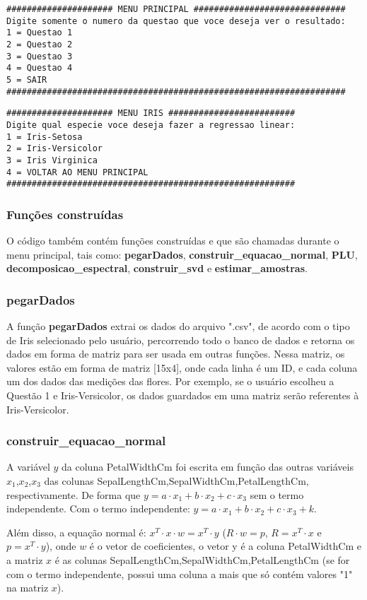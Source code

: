 \documentclass[a4paper,12pt,twoside]{article}
\begin{document}
\begin{lstlisting}
##################### MENU PRINCIPAL ##############################
Digite somente o numero da questao que voce deseja ver o resultado: 
1 = Questao 1
2 = Questao 2
3 = Questao 3
4 = Questao 4
5 = SAIR
###################################################################
\end{lstlisting}

\begin{lstlisting}
##################### MENU IRIS #########################
Digite qual especie voce deseja fazer a regressao linear: 
1 = Iris-Setosa
2 = Iris-Versicolor
3 = Iris Virginica
4 = VOLTAR AO MENU PRINCIPAL
#########################################################
\end{lstlisting}

\subsubsection{Funções construídas}
O código também contém funções construídas e que são chamadas durante o menu principal, tais como: \textbf{pegarDados}, \textbf{construir\_equacao\_normal}, \textbf{PLU}, \textbf{decomposicao\_espectral}, \textbf{construir\_svd} e \textbf{estimar\_amostras}.
\subsubsection{pegarDados}
   A função \textbf{pegarDados} extrai os dados do arquivo ".csv", de acordo com o tipo de Iris selecionado pelo usuário, percorrendo todo o banco de dados e retorna os dados em forma de matriz para ser usada em outras funções. Nessa matriz, os valores estão em forma de matriz [15x4], onde cada linha é um ID, e cada coluna um dos dados das medições das flores. Por exemplo, se o usuário escolheu a Questão 1 e Iris-Versicolor, os dados guardados em uma matriz serão referentes à Iris-Versicolor.
\subsubsection{construir\_equacao\_normal}
A variável $y$ da coluna PetalWidthCm foi escrita em função das outras variáveis $x_{1}$,$x_{2}$,$x_{3}$ das colunas SepalLengthCm,SepalWidthCm,PetalLengthCm, respectivamente. De forma que 
$y= a\cdot x_{1} +b\cdot x_{2}+c\cdot x_{3}$ sem o termo independente. Com o termo independente: $y= a\cdot x_{1} +b\cdot x_{2}+c\cdot x_{3} +k$.

    Além disso, a equação normal é: $x^{T}\cdot x\cdot w=x^{T}\cdot y$ ($R\cdot w=p$, $R=x^{T}\cdot x$ e $p = x^{T}\cdot y$), onde $w$ é o vetor de coeficientes, o vetor y é a coluna PetalWidthCm e a matriz $x$ é as colunas SepalLengthCm,SepalWidthCm,PetalLengthCm (se for com o termo independente, possui uma coluna a mais que só contém valores "1" na matriz $x$).
    
\end{document}
